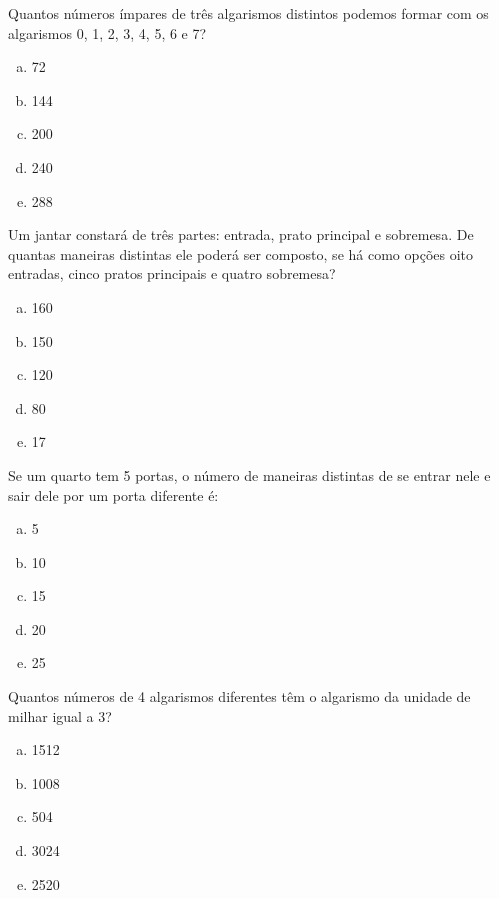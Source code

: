 		\item Quantos números ímpares de três algarismos distintos podemos formar com os algarismos 0, 1, 2, 3, 4, 5, 6 e 7?
		\begin{multicols}{5}
		 \begin{enumerate}[a)]
		 	\item 72
		 	\item 144
			\item 200
			\item 240
			\item 288
		 \end{enumerate}
		 \end{multicols}

		\item Um jantar constará de três partes: entrada, prato principal e sobremesa. De quantas maneiras distintas ele poderá ser composto, se há como opções oito entradas, cinco pratos principais e quatro sobremesa?
		\begin{multicols}{5}
		 \begin{enumerate}[a)]
		 	\item 160
		 	\item 150
		 	\item 120
		 	\item 80 
		 	\item 17 
		 \end{enumerate}
		 \end{multicols}
		 
		 \item Se um quarto tem 5 portas, o número de maneiras distintas de se entrar nele e sair dele por um porta diferente é:
		\begin{multicols}{5}
		 \begin{enumerate}[a)]
		 	\item 5
		 	\item 10
		 	\item 15
		 	\item 20
		 	\item 25 
		 \end{enumerate}
		 \end{multicols}

		\item Quantos números de 4 algarismos diferentes têm o algarismo da unidade de milhar igual a 3?
		\begin{multicols}{5}
		 \begin{enumerate}[a)]
		 	\item 1512 
		 	\item 1008
		 	\item 504
		 	\item 3024
		 	\item 2520
		 \end{enumerate}
		 \end{multicols}

